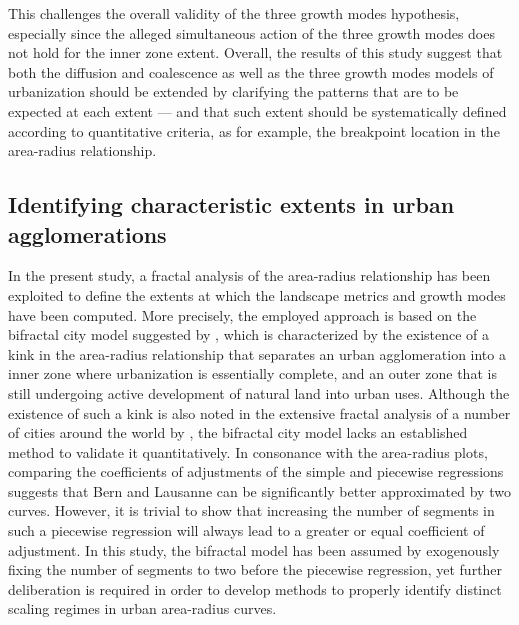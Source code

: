This challenges the overall validity of the three growth modes hypothesis, especially since the alleged simultaneous action of the three growth modes does not hold for the inner zone extent.
Overall, the results of this study suggest that both the diffusion and coalescence as well as the three growth modes models of urbanization should be extended by clarifying the patterns that are to be expected at each extent --- and that such extent should be systematically defined according to quantitative criteria, as for example, the breakpoint location in the area-radius relationship.


\subsection*{Identifying characteristic extents in urban agglomerations}  %

In the present study, a fractal analysis of the area-radius relationship has been exploited to define the extents at which the landscape metrics and growth modes have been computed.
More precisely, the employed approach is based on the bifractal city model suggested by \cite{white1993cellular}, which is characterized by the existence of a kink in the area-radius relationship that separates an urban agglomeration into a inner zone where urbanization is essentially complete, and an outer zone that is still undergoing active development of natural land into urban uses.
Although the existence of such a kink is also noted in the extensive fractal analysis of a number of cities around the world by \cite{frankhauser1994fractalite}, the bifractal city model lacks an established method to validate it quantitatively.
In consonance with the area-radius plots, comparing the coefficients of adjustments of the simple and piecewise regressions suggests that Bern and Lausanne can be significantly better approximated by two curves.
However, it is trivial to show that increasing the number of segments in such a piecewise regression will always lead to a greater or equal coefficient of adjustment.
In this study, the bifractal model has been assumed by exogenously fixing the number of segments to two before the piecewise regression, yet further deliberation is required in order to develop methods to properly identify distinct scaling regimes in urban area-radius curves.

